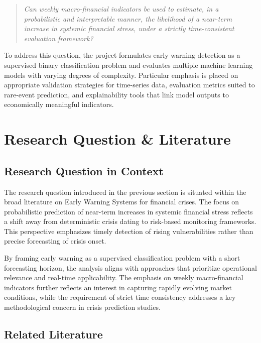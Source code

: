 \documentclass[11pt,a4paper]{article}
\begin{document}
\begin{quote}
\emph{Can weekly macro-financial indicators be used to estimate, in a probabilistic and interpretable manner, the likelihood of a near-term increase in systemic financial stress, under a strictly time-consistent evaluation framework?}
\end{quote}

To address this question, the project formulates early warning detection as a supervised binary classification problem and evaluates multiple machine learning models with varying degrees of complexity. Particular emphasis is placed on appropriate validation strategies for time-series data, evaluation metrics suited to rare-event prediction, and explainability tools that link model outputs to economically meaningful indicators.

\section{Research Question \& Literature}
\label{sec:literature}

\subsection{Research Question in Context}
\label{subsec:rq_context}

The research question introduced in the previous section is situated within the broad literature on Early Warning Systems for financial crises. The focus on probabilistic prediction of near-term increases in systemic financial stress reflects a shift away from deterministic crisis dating to risk-based monitoring frameworks. This perspective emphasizes timely detection of rising vulnerabilities rather than precise forecasting of crisis onset.

By framing early warning as a supervised classification problem with a short forecasting horizon, the analysis aligns with approaches that prioritize operational relevance and real-time applicability. The emphasis on weekly macro-financial indicators further reflects an interest in capturing rapidly evolving market conditions, while the requirement of strict time consistency addresses a key methodological concern in crisis prediction studies.

\subsection{Related Literature}
\label{subsec:related_literature}
\end{document}
